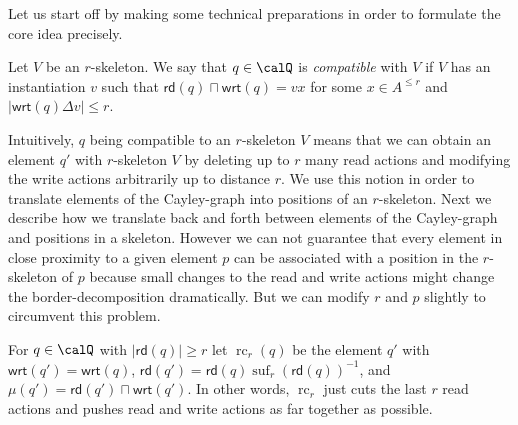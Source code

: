 \documentclass[a4paper,numberwithinsect,USenglish]{lipics-v2018}
\theoremstyle{plain}
\theoremstyle{remark}
\DeclareMathOperator{\suf}{suf}
\DeclareMathOperator{\cpr}{rc}
\newcommand{\rd}[1]{\mathsf{rd}(#1)}
\newcommand{\wrt}[1]{\mathsf{wrt}(#1)}
\newcommand{\Qx}{\calQ}
\begin{document}
Let us start off by making some technical preparations in order to formulate the core idea precisely.
\begin{definition}
	Let $V$ be an $r$-skeleton. We say that $q\in\Qx$ is \emph{compatible} with $V$ 
	if $V$ has an instantiation $v$ such that $\rd{q} \sqcap \wrt{q}= vx$ for some $x\in A^{\leq r}$ and 
	$|\wrt{q} \Delta v| \leq r$.
\end{definition}
Intuitively, $q$ being compatible to an $r$-skeleton $V$ means that we can obtain an element
$q'$ with $r$-skeleton $V$ by deleting up to $r$ many read actions and modifying the write
actions arbitrarily up to distance $r$. We use this notion in order to translate elements of the Cayley-graph
into positions of an $r$-skeleton. Next we describe how we translate back and forth between elements of the Cayley-graph and positions in a skeleton.
However we can not guarantee that every element in close proximity to a given element $p$ can be associated with a position in the $r$-skeleton of $p$ because small changes to the read and write actions might change the border-decomposition dramatically. But we can modify
$r$ and $p$ slightly to circumvent this problem.  
\begin{definition}
	For $q\in\Qx$ with $|\rd{q}| \geq r$ let $\cpr_r(q)$ be the element $q'$  with $\wrt{q'} = \wrt{q}$, $\rd{q'}=\rd{q}\suf_{r}({\rd{q}})^{-1}$, and $\mu({q'}) = \rd{q'} \sqcap \wrt{q'}$.
	In other words, $\cpr_r$ just cuts the last $r$ read actions and pushes read and write actions as far together as possible. 
\end{definition}
\end{document}
